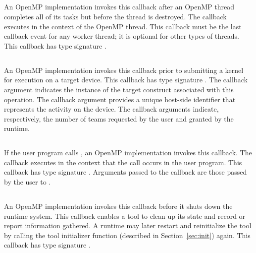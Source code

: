 \subsection{}
An OpenMP implementation invokes this callback
after an OpenMP thread completes all of
its tasks but before the thread is destroyed. The callback
executes in the context of the OpenMP thread. This callback must be the last callback event for any worker thread; it is optional for other types of threads.
This callback has type signature .

\subsection{}

An OpenMP implementation invokes this callback prior to submitting a kernel for execution on a target device.
This callback has type signature .
The callback argument  indicates the instance of the target construct associated with this operation.
The callback argument  provides a unique host-side identifier that represents the activity on the device.
The callback arguments    indicate, respectively, the number of teams requested by the user and granted by the runtime.

\subsection{}
\label{sec:ompt_event_tcontrol}
If the user program calls , an
OpenMP implementation invokes this callback.
The callback executes in the context that the call occurs in the user program.
This callback has type signature .
Arguments passed to the callback are those passed by the user to .

\subsection{}
An OpenMP implementation invokes this callback before it shuts down the
 runtime system.  This callback enables a tool to clean up its
 state and record or report information gathered. A runtime may later restart and reinitialize the tool by
calling the tool initializer
function (described in Section~\ref{sec:init}) again.
 This callback has type signature .

